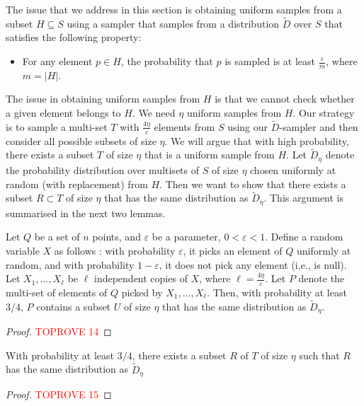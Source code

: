 \documentclass[11pt]{llncs}
\newcommand{\veps}{\varepsilon}
\newcommand{\D}{\tilde{D}}
\begin{document}
The issue that we address in this section is obtaining uniform samples from a subset $H \subseteq S$ using a sampler that samples from a distribution $\D$ over $S$ that satisfies the following property:
\begin{itemize}
\item For any element $p \in H$, the probability that $p$ is sampled is at least $\frac{\veps}{m}$, where $m = |H|$.
\end{itemize}
The issue in obtaining uniform samples from $H$ is that we cannot check whether a given element belongs to $H$. 
We need $\eta$ uniform samples from $H$.
Our strategy is to sample a multi-set $T$ with $\frac{4\eta}{\veps}$ elements from $S$ using our $\D$-sampler and then consider all possible subsets of size $\eta$. We will argue that with high probability, there exists a subset $T$ of size $\eta$ that is a uniform sample from $H$. 
Let $\D_{\eta}$ denote the probability distribution over multisets of $S$ of size $\eta$ chosen uniformly at random (with replacement) from $H$. Then we want to show that there exists a subset $R \subset T$ of size $\eta$ that has the same distribution as $\D_{\eta}$.
This argument is summarised in the next two lemmas.





\begin{lemma}
\label{lem:clinaba}
Let $Q$ be a set of $n$ points, and $\veps$ be a parameter, $0 < \veps < 1$. Define a random variable $X$ as follows :
with probability $\veps$, it picks an element of $Q$ uniformly at random, and with probability $1-\veps$, it does not
pick any element (i.e., is null). Let $X_1, \ldots, X_\ell$ be $\ell$ independent copies of $X$, where $\ell = \frac{4\eta}{\veps}.$
Let $P$ denote the multi-set of elements of $Q$ picked by $X_1, \ldots, X_\ell$. Then, with probability at least $3/4$,
$P$ contains a subset $U$ of size $\eta$ that has the same distribution as $\D_{\eta}$.
\end{lemma}
\begin{proof}\textcolor{red}{TOPROVE 14}\end{proof}


\begin{lemma}
\label{lem:final}
With probability at least $3/4$, there exists a subset $R$ of $T$ of size $\eta$ such that $R$ has the same distribution as $\D_{\eta}$
\end{lemma}
\begin{proof}\textcolor{red}{TOPROVE 15}\end{proof}
\end{document}
